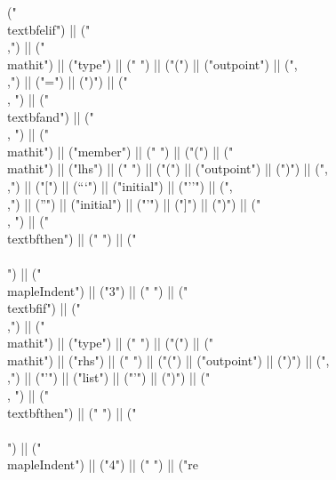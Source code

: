 \documentclass{article}
\begin{document}
\begin{center}
\begin{maplelatex}
{("\\textbf{elif}") || (" \\,") || ("\\mathit{") || ("type") || ("} ") || ("(") || ("outpoint") || (",\\,") || ("=") || (")") || (" \\, ") || ("\\textbf{and}") || (" \\, ") || ("\\mathit{") || ("member") || ("} ") || ("(") || ("\\mathit{") || ("lhs") || ("} ") || ("(") || ("outpoint") || (")") || (",\\,") || ("[") || ("``") || ("initial") || ("''") || (",\\,") || ("'") || ("initial") || ("'") || ("]") || (")") || (" \\, ") || ("\\textbf{then}") || (" ") || ("\\\\\n") || ("\\mapleIndent{") || ("3") || ("} ") || ("\\textbf{if}") || (" \\,") || ("\\mathit{") || ("type") || ("} ") || ("(") || ("\\mathit{") || ("rhs") || ("} ") || ("(") || ("outpoint") || (")") || (",\\,") || ("'") || ("list") || ("'") || (")") || (" \\, ") || ("\\textbf{then}") || (" ") || ("\\\\\n") || ("\\mapleIndent{") || ("4") || ("} ") || ("re}
\end{maplelatex}
\end{center}
\end{document}
